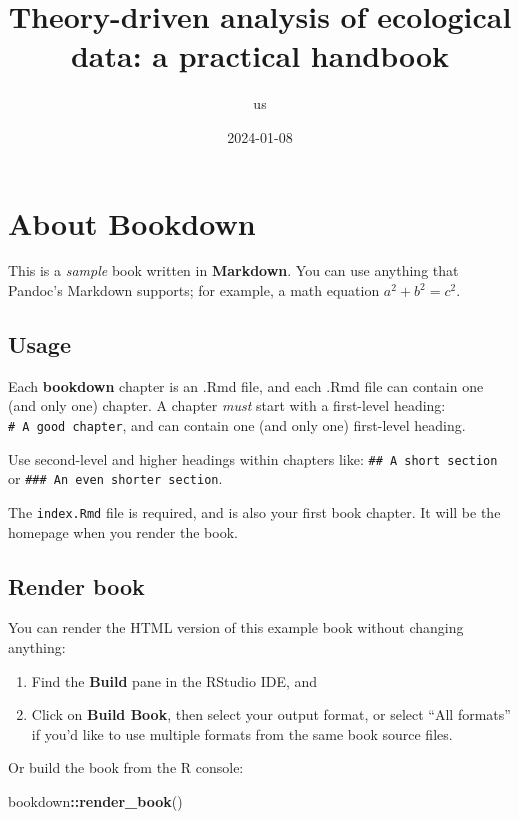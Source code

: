 \documentclass[
]{book}
\title{Theory-driven analysis of ecological data: a practical handbook}
\author{us}
\date{2024-01-08}
\newenvironment{Shaded}{\begin{snugshade}}{\end{snugshade}}
\newcommand{\FunctionTok}[1]{\textcolor[rgb]{0.13,0.29,0.53}{\textbf{#1}}}
\newcommand{\NormalTok}[1]{#1}
\newcommand{\SpecialCharTok}[1]{\textcolor[rgb]{0.81,0.36,0.00}{\textbf{#1}}}
\theoremstyle{definition}
\theoremstyle{definition}
\theoremstyle{definition}
\theoremstyle{definition}
\theoremstyle{remark}
\begin{document}
\maketitle

{
\setcounter{tocdepth}{1}
\tableofcontents
}
\chapter{About Bookdown}\label{about-bookdown}

This is a \emph{sample} book written in \textbf{Markdown}. You can use anything that Pandoc's Markdown supports; for example, a math equation \(a^2 + b^2 = c^2\).

\section{Usage}\label{usage}

Each \textbf{bookdown} chapter is an .Rmd file, and each .Rmd file can contain one (and only one) chapter. A chapter \emph{must} start with a first-level heading: \texttt{\#\ A\ good\ chapter}, and can contain one (and only one) first-level heading.

Use second-level and higher headings within chapters like: \texttt{\#\#\ A\ short\ section} or \texttt{\#\#\#\ An\ even\ shorter\ section}.

The \texttt{index.Rmd} file is required, and is also your first book chapter. It will be the homepage when you render the book.

\section{Render book}\label{render-book}

You can render the HTML version of this example book without changing anything:

\begin{enumerate}
\def\labelenumi{\arabic{enumi}.}
\item
  Find the \textbf{Build} pane in the RStudio IDE, and
\item
  Click on \textbf{Build Book}, then select your output format, or select ``All formats'' if you'd like to use multiple formats from the same book source files.
\end{enumerate}

Or build the book from the R console:

\begin{Shaded}
\begin{Highlighting}[]
\NormalTok{bookdown}\SpecialCharTok{::}\FunctionTok{render\_book}\NormalTok{()}
\end{Highlighting}
\end{Shaded}
\end{document}
